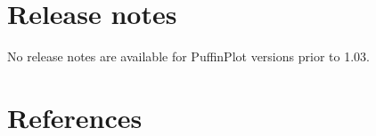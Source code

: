 \documentclass[a4paper,british]{article}
\begin{document}
\clearpage

\section{Release notes}



\vspace{2cm}

\noindent No release notes are available for PuffinPlot versions prior to
1.03.

\clearpage
\renewcommand*{\refname}{\vspace{-1cm}} 
\section{References}


\end{document}
